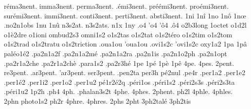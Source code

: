{  réma3nent.
  imma3nent.
 perma3nent.
  .émi3nent.
préémi3nent.
proémi3nent.
surémi3nent.
  immi3nent.
 conti3nent.
 perti3nent.
 absti3nent.
%
1ni
1nî
1no
1nô
1nœ
                    .no2n1obs
1nu
1nû
                    n3s2at.
                    n3s2ats.
n1x
1ny
.o4
'o4
'ô4
.ô4
                    o2b3long
                    1octet %
                    o1d2l
                    o1è2dre
                    o1ioni
                    ombud2s3
                    omni1s2
                    o1s2tas
                    o1s2tat
                    o1s2téro
                    o1s2tim
                    o1s2tom
                    o1s2trad
                    o1s2tratu
                    o1s2triction
                    .oua1ou
                    'oua1ou
                    .ovi1s2c
                    'ovi1s2c
                    oxy1a2
1pa
1pâ
                    paléo1é2
                    .pa2n1a2f
                    .pa2n1a2mé
                    .pa2n1a2ra
                    .pa2n1is
                    .pa2n1o2ph
                    .pa2n1opt
                    .pa2r1a2che
                    .pa2r1a2chè
                    .para1s2
                    .pa2r3hé
1pe
1pé
1pè
1pê
4pe.
4pes.
   2pent.
 re3pent.
.ar3pent.
'ar3pent.
ser3pent.
%
                    .pen2ta %
                    per3h
                    pé2nul %
                    .pe4r
                    .per1a2
                    .per1e2
                    .per1é2
                    .per1i2
                    .per1o2
                    .per1u2
                    pé1r2é2q %
                    .péri1os
                    .péri1s2
                    .péri2s3s
                    .péri2s3ta
                    .péri1u2
1p2h
.ph4
4ph.
                    .phalan3s2t
4phe.
4phes.
2phent. %
ph2l
4phle.
4phles.
2phn
                    photo1s2
ph2r
4phre.
4phres.
2phs
2pht
                    3ph2talé
                    3ph2tis
}
